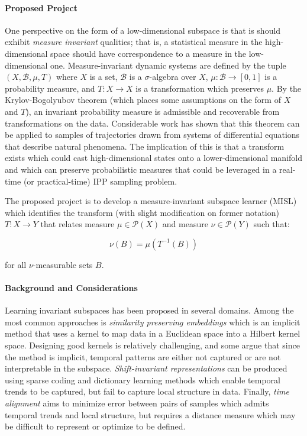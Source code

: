 \paragraph{Proposed Project} 
One perspective on the form of a low-dimensional subspace is that is should exhibit \emph{measure invariant} qualities; that is, a statistical measure in the high-dimensional space should have correspondence to a measure in the low-dimensional one.
Measure-invariant dynamic systems are defined by the tuple $(X, \mathcal{B}, \mu, T)$ where $X$ is a set, $\mathcal{B}$ is a $\sigma$-algebra over $X$, $\mu: \mathcal{B} \longrightarrow [0,1]$ is a probability measure, and $T: X \longrightarrow X$ is a transformation which preserves $\mu$.
By the Krylov-Bogolyubov theorem\autocite{kryloff1937theorie} (which places some assumptions on the form of $X$ and $T$), an invariant probability measure is admissible and recoverable from transformations on the data.
Considerable work has shown that this theorem can be applied to samples of trajectories drawn from systems of differential equations that describe natural phenomena\autocite{stannat2011stochastic,touze2021model,vizzaccaro2022high}.
The implication of this is that a transform exists which could cast high-dimensional states onto a lower-dimensional manifold and which can preserve probabilistic measures that could be leveraged in a real-time (or practical-time) IPP sampling problem.

The proposed project is to develop a measure-invariant subspace learner (MISL) which identifies the transform (with slight modification on former notation) $T: X\rightarrow Y$ that relates measure $\mu \in \mathcal{P}(X)$ and measure $\nu \in \mathcal{P}(Y)$ such that:

\begin{equation*}
    \nu(B) = \mu(T^{-1}(B))
\end{equation*}

\noindent for all $\nu$-measurable sets $B$.

\paragraph{Background and Considerations}
Learning invariant subspaces has been proposed in several domains.
Among the most common approaches is \emph{similarity preserving embeddings} which is an implicit method that uses a kernel to map data in a Euclidean space into a Hilbert kernel space\autocite{scholkopf1997kernel}.
Designing good kernels is relatively challenging, and some argue that since the method is implicit, temporal patterns are either not captured or are not interpretable in the subspace\autocite{deng2020invariant}.
\emph{Shift-invariant representations} can be produced using sparse coding and dictionary learning methods which enable temporal trends to be captured, but fail to capture local structure in data\autocite{lewicki1999coding}.
Finally, \emph{time alignment}\autocite{deng2020invariant} aims to minimize error between pairs of samples which admits temporal trends and local structure, but requires a distance measure which may be difficult to represent or optimize to be defined.

